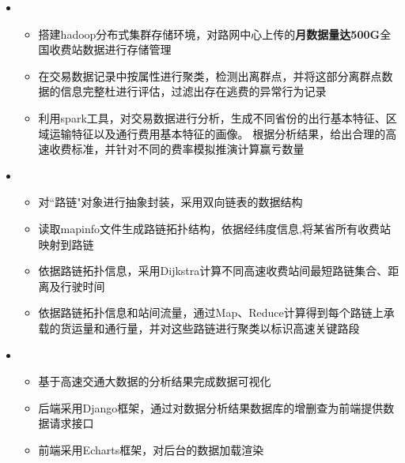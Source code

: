   \begin{itemize}[leftmargin=*]
    \item
      {\small
      \begin{itemize}
        \item 搭建hadoop分布式集群存储环境，对路网中心上传的\textbf{月数据量达500G}全国收费站数据进行存储管理
        \item 在交易数据记录中按属性进行聚类，检测出离群点，并将这部分离群点数据的信息完整杜进行评估，过滤出存在逃费的异常行为记录%
        \item 利用spark工具，对交易数据进行分析，生成不同省份的出行基本特征、区域运输特征以及通行费用基本特征的画像。 根据分析结果，给出合理的高速收费标准，并针对不同的费率模拟推演计算赢亏数量
      \end{itemize}
      }
	\item
	  {\small
      \begin{itemize}
      	\item 对“路链"对象进行抽象封装，采用双向链表的数据结构
        \item 读取mapinfo文件生成路链拓扑结构，依据经纬度信息,将某省所有收费站映射到路链
        \item 依据路链拓扑信息，采用Dijkstra计算不同高速收费站间最短路链集合、距离及行驶时间
        \item 依据路链拓扑信息和站间流量，通过Map、Reduce计算得到每个路链上承载的货运量和通行量，并对这些路链进行聚类以标识高速关键路段
      \end{itemize}
      }
    \item
      {\small
      \begin{itemize}
      	\item 基于高速交通大数据的分析结果完成数据可视化
        \item 后端采用Django框架，通过对数据分析结果数据库的增删查为前端提供数据请求接口
        \item 前端采用Echarts框架，对后台的数据加载渲染
      \end{itemize}
      }
  \end{itemize}